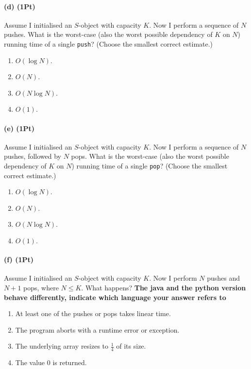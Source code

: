 \documentclass{tufte-handout}
\begin{document}
      \paragraph*{(d) (1Pt)}
      Assume I initialised an $S$-object with capacity $K$. 
      Now I perform a sequence of $N$ pushes.
      What is the worst-case (also the worst possible dependency of $K$ on $N$) running time of a single \texttt{push}?  (Choose the smallest correct estimate.)
      \begin{enumerate}
        \item $O(\log N)$. \\
        \item $O(N)$. \\
        \item $O(N\log N)$. \\
        \item  $O(1)$. \\
      \end{enumerate} 

      \paragraph*{(e) (1Pt)}
      Assume I initialised an $S$-object with capacity $K$. 
      Now I perform a sequence of $N$ pushes, followed by $N$ pops.
      What is the worst-case (also the worst possible dependency of $K$ on $N$) running time of a single \texttt{pop}?  (Choose the smallest correct estimate.)
      \begin{enumerate}
        \item $O(\log N)$. \\
        \item $O(N)$. \\
        \item $O(N\log N)$. \\
        \item  $O(1)$. \\
      \end{enumerate} 
      \paragraph*{(f) (1Pt)}
      Assume I initialised an $S$-object with capacity $K$. 
      Now I perform $N$ pushes and $N+1$ pops, where $N\leq K$.
      What happens? \textbf{The java and the python version behave differently, indicate which language your answer refers to}
      \begin{enumerate}
	\item At least one of the pushes or pops takes linear time. \\
	\item The program aborts with a runtime error or exception. \\
	\item The underlying array resizes to $\frac{1}{4}$ of its size. \\
	\item The value 0 is returned. \\
      \end{enumerate} 
\end{document}
